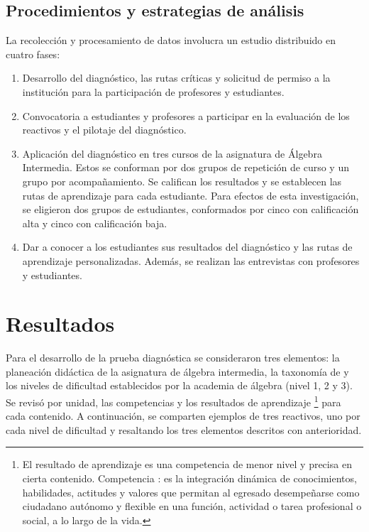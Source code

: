 \documentclass[spanish]{textolivre}
\begin{document}
\subsection{Procedimientos y estrategias de análisis}\label{sec-formato}
La recolección y procesamiento de datos involucra un estudio distribuido en cuatro fases:

\begin{enumerate}
    \item Desarrollo del diagnóstico, las rutas críticas y solicitud de permiso a la institución para la participación de profesores y estudiantes. 
\item Convocatoria a estudiantes y profesores a participar en la evaluación de los reactivos y el pilotaje del diagnóstico.
\item Aplicación del diagnóstico en tres cursos de la asignatura de Álgebra Intermedia. Estos se conforman por dos grupos de repetición de curso y un grupo por acompañamiento. Se califican los resultados y se establecen las rutas de aprendizaje para cada estudiante. Para efectos de esta investigación, se eligieron dos grupos de estudiantes, conformados por cinco con calificación alta y cinco con calificación baja. 
\item Dar a conocer a los estudiantes sus resultados del diagnóstico y las rutas de aprendizaje personalizadas. Además, se realizan las entrevistas con profesores y estudiantes.
\end{enumerate}

\section{Resultados}\label{sec-modelo}
Para el desarrollo de la prueba diagnóstica se consideraron tres elementos: la planeación didáctica de la asignatura de álgebra intermedia, la taxonomía de \textcite{marzano2008} y los niveles de dificultad establecidos por la academia de álgebra (nivel 1, 2 y 3). Se revisó por unidad, las competencias y los resultados de aprendizaje  \footnote{El resultado de aprendizaje es una competencia de menor nivel y precisa en cierta contenido. Competencia \cite{uady2012}:%
es la integración dinámica de conocimientos, habilidades, actitudes y valores que permitan al egresado desempeñarse como ciudadano autónomo y flexible en una función, actividad o tarea profesional o social, a lo largo de la vida.}  para cada contenido. A continuación, se comparten ejemplos de tres reactivos, uno por cada nivel de dificultad y resaltando los tres elementos descritos con anterioridad.
\end{document}
